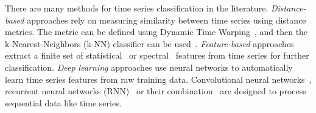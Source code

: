 \documentclass[referee, pdflatex, sn-mathphys-num]{sn-jnl}
\theoremstyle{definition}
\theoremstyle{plain}
\begin{document}
	There are many methods for time series classification in the literature. \emph{Distance-based} approaches rely on measuring similarity between time series using distance metrics. The metric can be defined using Dynamic Time Warping~\cite{dtw}, and then the k-Nearest-Neighbors (k-NN) classifier can be used~\cite{knn_dtw}. \emph{Feature-based} approaches extract a finite set of statistical~\cite{stat_feat_1, stat_feat_2} or spectral~\cite{fouirer_feat} features from time series for further classification. \emph{Deep learning} approaches use neural networks to automatically learn time series features from raw training data. Convolutional neural networks~\cite{application_eeg_1, application_eeg_2}, recurrent neural networks (RNN)~\cite{lstm_feat} or their combination~\cite{application_sound_1, application_hac, application_weather} are designed to process sequential data like time series.
	
\end{document}

